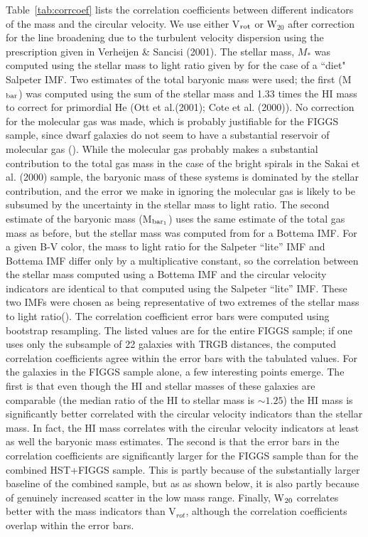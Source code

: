 \documentclass[useAMS,usenatbib]{mn2e}
\begin{document}
    Table~\ref{tab:corrcoef} lists the correlation coefficients between different indicators of the mass and the circular velocity.
We use either V$_{\rm rot}$ or W$_{20}$ after correction for the line broadening due to the turbulent velocity dispersion using the prescription  given in Verheijen \& Sancisi (2001).
The stellar mass, $M_{*}$ was computed using the stellar mass to light ratio given by \cite{bell03} for the case of a ``diet" Salpeter IMF. Two estimates of the total baryonic mass were used; the first (M$_{\rm bar}$) was computed using the sum of the stellar mass and 1.33 times the HI mass to correct for primordial He (Ott et al.(2001);
Cote et al. (2000)).
No correction for the molecular gas was made, which is probably 
justifiable for the FIGGS sample, since dwarf galaxies do not seem to have a substantial reservoir of molecular gas (\cite{taylor98}). While the molecular gas probably makes a substantial contribution to the total gas mass in the case of the bright spirals in the Sakai et al. (2000) sample, the baryonic mass of these systems is dominated by the stellar contribution, and the error we make in ignoring the molecular gas is likely to be subsumed by the uncertainty in the stellar mass to light ratio. The second estimate of the baryonic mass (M$_{\rm bar_1}$) uses the same estimate of the total gas mass as before, but the stellar mass was computed from \cite{bell03} for a Bottema IMF. For a given B-V color, the mass to light ratio for the Salpeter ``lite'' IMF and Bottema IMF differ only by a multiplicative constant, so the correlation between the stellar mass computed using a Bottema IMF and the circular velocity indicators are identical to that computed using the Salpeter ``lite'' IMF. These two IMFs were chosen as being representative of two extremes of the stellar mass to light ratio(\cite{bell03}). The correlation coefficient error bars were computed using bootstrap resampling. The listed values are for the entire FIGGS sample; if one uses only the subsample of 22 galaxies with TRGB distances, the computed correlation coefficients agree within the error bars with the tabulated values. For the galaxies in the FIGGS sample alone,  a few interesting points emerge. The first is that even though the HI and stellar masses of these galaxies are comparable (the median ratio of the HI to stellar mass is $\sim 1.25$) the HI mass is significantly better correlated with the circular velocity  indicators than the stellar mass. In fact, the HI mass correlates with the circular velocity indicators at least as well the baryonic mass estimates. The second is that the error bars in the correlation coefficients are significantly larger for the FIGGS sample than for the combined HST+FIGGS sample. This is partly because of the substantially larger baseline of the combined sample, but as as shown below, it is also partly because of genuinely increased scatter in the low mass range. Finally, W$_{\rm 20}$ correlates better with the mass indicators than V$_{rot}$, although the correlation coefficients overlap within the error bars.
\end{document}
